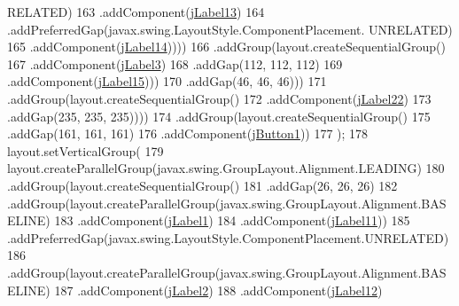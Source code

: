 \begin{DoxyCode}
      RELATED)
163                                             .addComponent(\mbox{\hyperlink{class_interfaz_package_1_1_interfaz_consulta_factura_a57b866843fb85f8fa14ad3f78bafe6ed}{jLabel13}})
164                                             .addPreferredGap(javax.swing.LayoutStyle.ComponentPlacement.
      UNRELATED)
165                                             .addComponent(\mbox{\hyperlink{class_interfaz_package_1_1_interfaz_consulta_factura_ac1f0ed85064a9ed6bac8edad397a6c55}{jLabel14}}))))
166                                 .addGroup(layout.createSequentialGroup()
167                                     .addComponent(\mbox{\hyperlink{class_interfaz_package_1_1_interfaz_consulta_factura_a05ebb163b51721c3ff33b7ac276766e7}{jLabel3}})
168                                     .addGap(112, 112, 112)
169                                     .addComponent(\mbox{\hyperlink{class_interfaz_package_1_1_interfaz_consulta_factura_afb0f847d7f072d789f7dce6ef6fb2189}{jLabel15}})))
170                             .addGap(46, 46, 46)))
171                     .addGroup(layout.createSequentialGroup()
172                         .addComponent(\mbox{\hyperlink{class_interfaz_package_1_1_interfaz_consulta_factura_a338924ad3911c841159af6eb75aa2473}{jLabel22}})
173                         .addGap(235, 235, 235))))
174             .addGroup(layout.createSequentialGroup()
175                 .addGap(161, 161, 161)
176                 .addComponent(\mbox{\hyperlink{class_interfaz_package_1_1_interfaz_consulta_factura_a567e35d7d891c79841a45e5a58b8b917}{jButton1}}))
177         );
178         layout.setVerticalGroup(
179             layout.createParallelGroup(javax.swing.GroupLayout.Alignment.LEADING)
180             .addGroup(layout.createSequentialGroup()
181                 .addGap(26, 26, 26)
182                 .addGroup(layout.createParallelGroup(javax.swing.GroupLayout.Alignment.BASELINE)
183                     .addComponent(\mbox{\hyperlink{class_interfaz_package_1_1_interfaz_consulta_factura_aa4f98cc39ae51135b1d8e0e06f11af83}{jLabel1}})
184                     .addComponent(\mbox{\hyperlink{class_interfaz_package_1_1_interfaz_consulta_factura_a1919b598f93c83b94462145aac6a0bad}{jLabel11}}))
185                 .addPreferredGap(javax.swing.LayoutStyle.ComponentPlacement.UNRELATED)
186                 .addGroup(layout.createParallelGroup(javax.swing.GroupLayout.Alignment.BASELINE)
187                     .addComponent(\mbox{\hyperlink{class_interfaz_package_1_1_interfaz_consulta_factura_a38f87d430d09d898be8970e195019a3a}{jLabel2}})
188                     .addComponent(\mbox{\hyperlink{class_interfaz_package_1_1_interfaz_consulta_factura_ae159c41381ffd7d9927b558e61a5deb5}{jLabel12}})

\end{DoxyCode}
